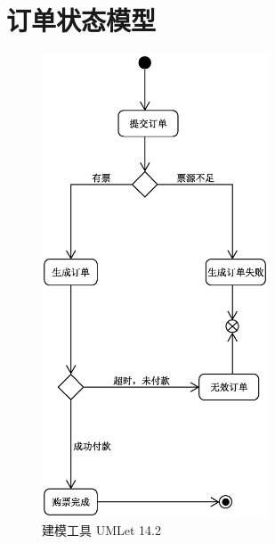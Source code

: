 \documentclass[a4paper]{article}
\begin{document}
  \section{订单状态模型}
    \begin{figure}[H]
      \centering
      \includegraphics[width=0.6\textwidth]{state_lineitem.eps}
      \caption{建模工具 UMLet 14.2}
    \end{figure}
\end{document}
